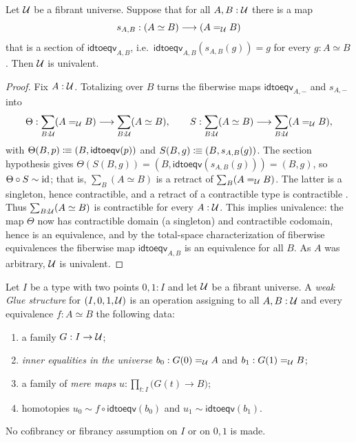 \begin{lemma}\label{lem:ua-from-section}
	Let $\mathcal{U}$ be a fibrant universe. Suppose that for all $A,B:\mathcal{U}$ there is a
	map
	\[
		s_{A,B} : (A \simeq B) \longrightarrow (A =_{\mathcal{U}} B)
	\]
	that is a section of $\mathsf{idtoeqv}_{A,B}$, i.e.\
	$\mathsf{idtoeqv}_{A,B}(s_{A,B}(g)) = g$ for every $g : A \simeq B$. Then
	$\mathcal{U}$ is univalent.
\end{lemma}

\begin{proof}
	Fix $A:\mathcal{U}$. Totalizing over $B$ turns the fiberwise maps
	$\mathsf{idtoeqv}_{A,-}$ and $s_{A,-}$ into
	\[
		\Theta : \sum_{B:\mathcal{U}}(A =_{\mathcal{U}} B) \longrightarrow \sum_{B:\mathcal{U}}(A \simeq B),
		\qquad
		S : \sum_{B:\mathcal{U}}(A \simeq B) \longrightarrow \sum_{B:\mathcal{U}}(A =_{\mathcal{U}} B),
	\]
	with $\Theta(B,p) \mathrel{\vcentcolon\mspace{-1mu}\equiv} (B,\mathsf{idtoeqv}(p))$ and
	$S(B,g) \mathrel{\vcentcolon\mspace{-1mu}\equiv} (B,s_{A,B}(g))$. The section hypothesis gives
	$\Theta(S(B,g)) = (B,\mathsf{idtoeqv}(s_{A,B}(g))) = (B,g)$, so
	$\Theta \circ S \sim \operatorname{id}$; that is, $\sum_{B}(A\simeq B)$ is a retract of
	$\sum_{B}(A =_{\mathcal{U}} B)$. The latter is a singleton, hence contractible, and a
	retract of a contractible type is contractible \citep[\S3.11]{HoTTBook}.
	Thus $\sum_{B:\mathcal{U}}(A\simeq B)$ is contractible for every $A:\mathcal{U}$. This
	implies univalence: the map $\Theta$ now has contractible domain (a
	singleton) and contractible codomain, hence is an equivalence, and by the
	total-space characterization of fiberwise equivalences \citep[\S4.7]{HoTTBook}
	the fiberwise map $\mathsf{idtoeqv}_{A,B}$ is an equivalence for all $B$.
	As $A$ was arbitrary, $\mathcal{U}$ is univalent.
\end{proof}

\begin{definition}[\flink{Definition-5-11} Weak Glue structure]\label{def:weak-glue}
	Let $I$ be a type with two points $0,1:I$ and let $\mathcal{U}$ be a fibrant
	universe. A \emph{weak Glue structure} for $(I,0,1,\mathcal{U})$ is an operation
	assigning to all $A,B:\mathcal{U}$ and every equivalence $f:A\simeq B$ the
	following data:
	\begin{enumerate}[noitemsep]
		\item a family $G:I\to\mathcal{U}$;
		\item \emph{inner equalities in the universe} $b_0:G(0)=_{\mathcal{U}} A$ and $b_1:G(1)=_{\mathcal{U}} B$;
		\item a family of \emph{mere maps} $u:\prod_{t:I}\bigl(G(t)\to B\bigr)$;
		\item homotopies $u_0\sim f\circ\mathsf{idtoeqv}(b_0)$ and
		      $u_1\sim \mathsf{idtoeqv}(b_1)$.
	\end{enumerate}
	No cofibrancy or fibrancy assumption on $I$ or on $0,1$ is made.
\end{definition}

